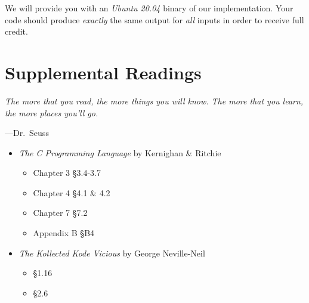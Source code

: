 \documentclass[11pt]{article}
\begin{document}
We will provide you with an \emph{Ubuntu 20.04} binary of our implementation.
Your code should produce \emph{exactly} the same output for \emph{all} inputs in
order to receive full credit.


\section{Supplemental Readings}

\epigraph{\emph{The more that you read, the more things you will know. The
more that you learn, the more places you'll go.}}{---Dr.\ Seuss}

\begin{itemize}
  \item \textit{The C Programming Language} by Kernighan \& Ritchie
  \begin{itemize}
    \item Chapter 3 \S 3.4-3.7
    \item Chapter 4 \S 4.1 \& 4.2
    \item Chapter 7 \S 7.2
    \item Appendix B \S B4
  \end{itemize}
\item \textit{The Kollected Kode Vicious} by George Neville-Neil
\begin{itemize}
\item \S 1.16
\item \S 2.6
\end{itemize}
\end{itemize}
\end{document}
